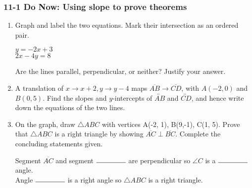 \documentclass[12pt, twoside]{article}
\begin{document}
\subsubsection*{11-1 Do Now: Using slope to prove theorems}
  \begin{enumerate}

\item Graph and label the two equations. Mark their intersection as an ordered pair.

  \begin{multicols}{2}
    $y = -2x+3$ \\
    $2x-4y = 8$
  \end{multicols}
  Are the lines parallel, perpendicular, or neither? Justify your answer.
  \vspace{1.5cm}

  \begin{center} %
  \end{center}


    \item A translation of $x \rightarrow x+2, y \rightarrow y-4$ maps $\overline{AB} \rightarrow \overline{CD}$, with $A(-2,0)$ and $B(0,5)$. Find the slopes and $y$-intercepts of $\overleftrightarrow{AB}$ and $\overleftrightarrow{CD}$, and hence write down the equations of the two lines.

\newpage

\item On the graph, draw $\triangle ABC$ with vertices A(-2, 1), B(9,-1), C(1, 5). Prove that $\triangle ABC$ is a right triangle by showing $\overline{AC} \perp \overline{BC}$. Complete the concluding statements given.\\[1cm]
\vspace{8cm}

Segment $\overline{AC}$ and segment $\rule{1.5cm}{0.15mm}$ are perpendicular so $\angle C$ is a $\rule{1.5cm}{0.15mm}$ angle.\\[0.5cm]
Angle $\rule{1.5cm}{0.15mm}$ is a right angle so $\triangle ABC$ is a right triangle.

  \end{enumerate}
  \newpage
  \setcounter{page}{1}
\end{document}
